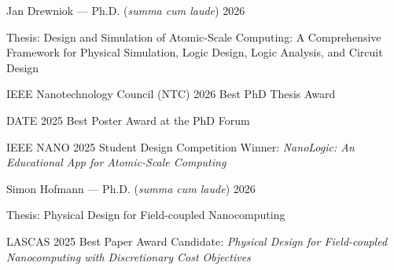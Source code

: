 \begin{cvsubentries}

  \phdsubentry
    {Jan Drewniok --- Ph.D. (\emph{summa cum laude})} %
    {2026} %
    {
      \begin{cvitems} %
        \item {Thesis: Design and Simulation of Atomic-Scale Computing: A Comprehensive Framework for Physical Simulation, Logic Design, Logic Analysis, and Circuit Design}
        \item {IEEE Nanotechnology Council (NTC) 2026 Best PhD Thesis Award}
        \item {DATE 2025 Best Poster Award at the PhD Forum}
        \item {IEEE NANO 2025 Student Design Competition Winner: \emph{NanoLogic: An Educational App for Atomic-Scale Computing}}
      \end{cvitems}
    }

  \phdsubentry
    {Simon Hofmann --- Ph.D. (\emph{summa cum laude})} %
    {2026} %
    {
      \begin{cvitems} %
        \item {Thesis: Physical Design for Field-coupled Nanocomputing}
        \item {LASCAS 2025 Best Paper Award Candidate: \emph{Physical Design for Field-coupled Nanocomputing with Discretionary Cost Objectives}}
      \end{cvitems}
    }

\end{cvsubentries}




